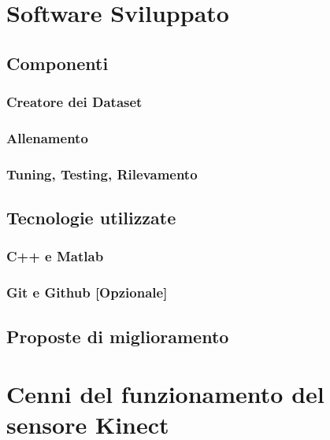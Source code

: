 \begin{appendices}
    \chapter{Software Sviluppato}
    \label{chap:software}
        \section{Componenti}
            \subsection{Creatore dei Dataset}
            \subsection{Allenamento}
            \subsection{Tuning, Testing, Rilevamento}
        \section{Tecnologie utilizzate}
            \subsection{C++ e Matlab}
            \subsection{Git e Github [Opzionale]}
        \section{Proposte di miglioramento}

    \chapter{Cenni del funzionamento del sensore Kinect}
    \label{chap:kinect_sensor}
\end{appendices}
